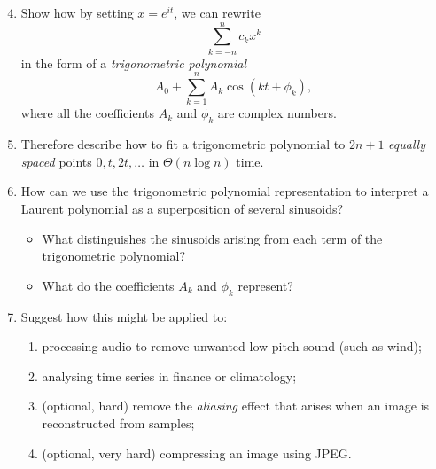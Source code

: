 \documentclass{article}
\begin{document}
\begin{question}
\begin{enumerate}[label=(\alph*)]
    \setcounter{enumi}{3}
    \item Show how by setting $x = e^{it}$, we can rewrite \[ \sum_{k=-n}^n c_k x^k \] in the form of a \emph{trigonometric polynomial} \[ A_0 + \sum_{k=1}^n A_k \cos(kt + \phi_k), \] where all the coefficients $A_k$ and $\phi_k$ are complex numbers.
    \item Therefore describe how to fit a trigonometric polynomial to $2n+1$ \emph{equally spaced} points $0, t, 2t, \ldots$ in $\Theta(n \log n)$ time.
    \item How can we use the trigonometric polynomial representation to interpret a Laurent polynomial as a superposition of several sinusoids?
    \begin{itemize}
        \item What distinguishes the sinusoids arising from each term of the trigonometric polynomial?
        \item What do the coefficients $A_k$ and $\phi_k$ represent?
    \end{itemize}
    \item Suggest how this might be applied to:
    \begin{enumerate}[label=(\roman*)]
        \item processing audio to remove unwanted low pitch sound (such as wind);
        \item analysing time series in finance or climatology;
        \item (optional, hard) remove the \emph{aliasing} effect that arises when an image is reconstructed from samples;
        \item (optional, very hard) compressing an image using JPEG.
    \end{enumerate}
\end{enumerate}
\end{question}
\end{document}
